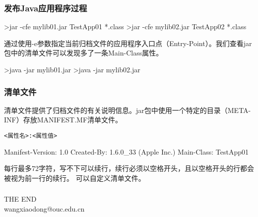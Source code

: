 \begin{frame}[fragile] %
  \frametitle{发布Java应用程序过程}


  \begin{shCode}
    >jar -cfe mylib01.jar TestApp01 *.class
    >jar -cfe mylib02.jar TestApp02 *.class
  \end{shCode}

  通过使用-e参数指定当前归档文件的应用程序入口点（Entry-Point）。我们查看jar包中的清单文件可以发现多了一条Main-Class属性。
  \begin{shCode}
    >java -jar mylib01.jar
    >java -jar mylib02.jar
  \end{shCode}
\end{frame}

\begin{frame}[fragile] %
  \frametitle{清单文件}

  清单文件提供了归档文件的有关说明信息。jar包中使用一个特定的目录（META-INF）存放MANIFEST.MF清单文件。


\begin{verbatim}
<属性名>:<属性值>
\end{verbatim}


  \begin{shCode}
    Manifest-Version: 1.0
    Created-By: 1.6.0_33 (Apple Inc.)
    Main-Class: TestApp01
  \end{shCode}

  每行最多72字符，写不下可以续行，续行必须以空格开头，且以空格开头的行都会被视为前一行的续行。
  可以自定义清单文件。
\end{frame}

\begin{frame}[fragile] %
  \frametitle{}

\end{frame}


\begin{frame}[focus]
  \centering
  {\Huge {THE END}} \\
  \vspace{5mm}
  {\Large wangxiaodong@ouc.edu.cn} \\
\end{frame}
